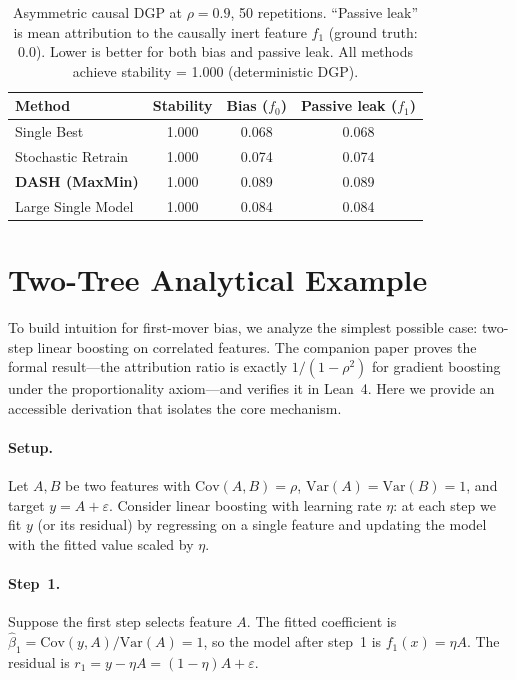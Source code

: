 \documentclass[11pt]{article}
\newcommand{\rhovar}{\rho}
\begin{document}
\begin{table}[htbp]
\centering
\caption{Asymmetric causal DGP at $\rho = 0.9$, 50 repetitions.
``Passive leak'' is mean attribution to the causally inert feature $f_1$
(ground truth: 0.0). Lower is better for both bias and passive leak.
All methods achieve stability = 1.000 (deterministic DGP).}
\label{tab:asymmetric}
\small
\begin{tabular}{lccc}
\toprule
\textbf{Method} & \textbf{Stability} & \textbf{Bias ($f_0$)} & \textbf{Passive leak ($f_1$)} \\
\midrule
Single Best & 1.000 & 0.068 & 0.068 \\
Stochastic Retrain & 1.000 & 0.074 & 0.074 \\
\textbf{DASH (MaxMin)} & 1.000 & 0.089 & 0.089 \\
Large Single Model & 1.000 & 0.084 & 0.084 \\
\bottomrule
\end{tabular}
\end{table}


\section{Two-Tree Analytical Example}
\label{app:twotree}

To build intuition for first-mover bias, we analyze the simplest possible
case: two-step linear boosting on correlated features. The companion
paper \citep{caraker2026impossibility} proves the formal result---the
attribution ratio is exactly $1/(1-\rhovar^2)$ for gradient boosting
under the proportionality axiom---and verifies it in Lean~4. Here we
provide an accessible derivation that isolates the core mechanism.

\paragraph{Setup.}
Let $A, B$ be two features with $\text{Cov}(A, B) = \rho$,
$\text{Var}(A) = \text{Var}(B) = 1$, and target $y = A + \varepsilon$.
Consider linear boosting with learning rate $\eta$: at each step we
fit $y$ (or its residual) by regressing on a single feature and updating
the model with the fitted value scaled by $\eta$.

\paragraph{Step~1.}
Suppose the first step selects feature $A$.  The fitted coefficient is
$\hat{\beta}_1 = \text{Cov}(y, A)/\text{Var}(A) = 1$, so the model
after step~1 is $f_1(x) = \eta A$.  The residual is
$r_1 = y - \eta A = (1 - \eta) A + \varepsilon$.
\end{document}
